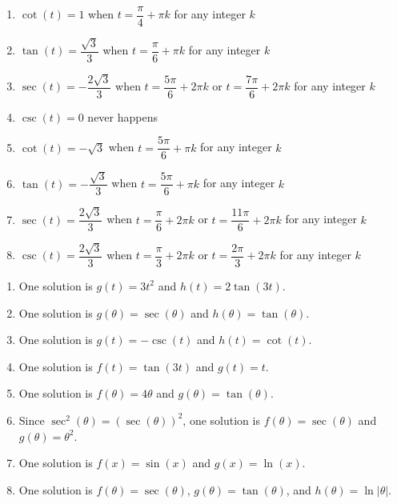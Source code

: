 \documentclass{ximera}
\begin{document}
\begin{enumerate}

\setcounter{enumi}{\value{HW}}

\item $\cot(t) = 1$ when $t = \dfrac{\pi}{4} + \pi k$ for any integer $k$
\item  $\tan(t) = \dfrac{\sqrt{3}}{3}$ when $t = \dfrac{\pi}{6} + \pi k$ for any integer $k$
\item $\sec(t) = -\dfrac{2\sqrt{3}}{3}$ when $t = \dfrac{5\pi}{6} + 2\pi k$ or $t = \dfrac{7\pi}{6} + 2\pi k$ for any integer $k$
\item $\csc(t) = 0$ never happens 
\item $\cot(t) = -\sqrt{3}$ when $t = \dfrac{5\pi}{6} + \pi k$ for any integer $k$
\item $\tan(t) = -\dfrac{\sqrt{3}}{3}$ when $t = \dfrac{5\pi}{6} + \pi k$ for any integer $k$
\item $\sec(t) = \dfrac{2\sqrt{3}}{3}$ when $t = \dfrac{\pi}{6} + 2\pi k$ or $t = \dfrac{11\pi}{6} + 2\pi k$ for any integer $k$
\item $\csc(t) = \dfrac{2\sqrt{3}}{3}$ when $t = \dfrac{\pi}{3} + 2\pi k$ or $t = \dfrac{2\pi}{3} + 2\pi k$ for any integer $k$

\setcounter{HW}{\value{enumi}}
\end{enumerate}

\begin{enumerate}
\setcounter{enumi}{\value{HW}}

\item  One solution is $g(t) = 3t^2$ and $h(t) = 2\tan(3t)$.

\item  One solution is $g(\theta) = \sec(\theta)$ and $h(\theta) = \tan(\theta)$.

\item  One solution is $g(t) = -\csc(t)$ and $h(t) = \cot(t)$.

\item  One solution is $f(t) = \tan(3t)$ and $g(t) = t$.

\item  One solution is $f(\theta) = 4 \theta$ and $g(\theta) = \tan(\theta)$.

\item  Since $\sec^{2}(\theta) = (\sec(\theta))^2$, one solution is $f(\theta) = \sec(\theta)$ and $g(\theta) = \theta^2$.

\item  One solution is $f(x) = \sin(x)$ and $g(x) = \ln(x)$.

\item  One solution is $f(\theta) = \sec(\theta)$, $g(\theta) = \tan(\theta)$, and $h(\theta) = \ln| \theta|$.

\setcounter{HW}{\value{enumi}}
\end{enumerate}
\end{document}
